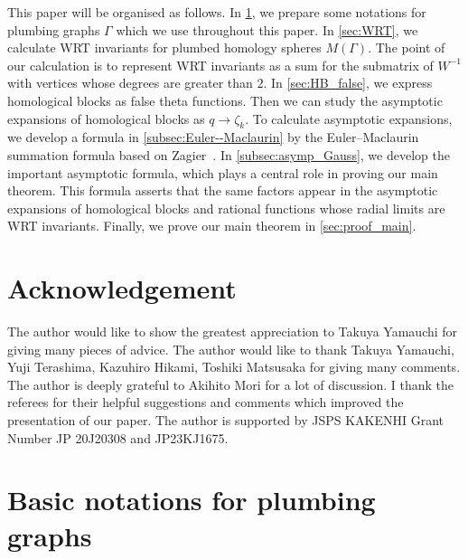 \documentclass[11pt,a4paper,lualatex]{amsart}
\numberwithin{equation}{section} %
\begin{document}
This paper will be organised as follows. 
In \cref{sec:fund_data}, we prepare some notations for plumbing graphs  $ \Gamma $ which we use throughout this paper.
In \cref{sec:WRT}, we calculate WRT invariants for plumbed homology spheres $ M(\Gamma) $.
The point of our calculation is to represent WRT invariants as a sum for the submatrix of $ W^{-1} $ with vertices whose degrees are greater than $ 2 $.
In \cref{sec:HB_false}, we express homological blocks as false theta functions.
Then we can study the asymptotic expansions of homological blocks as $ q \to \zeta_k $.
To calculate asymptotic expansions, we develop a formula in \cref{subsec:Euler--Maclaurin} by the Euler--Maclaurin summation formula based on Zagier~\cite[Equation (44)]{Zagier_asymptotic}.
In \cref{subsec:asymp_Gauss}, we develop the important asymptotic formula, which plays a central role in proving our main theorem.
This formula asserts that the same factors appear in the asymptotic expansions of homological blocks and rational functions whose radial limits are WRT invariants.
Finally, we prove our main theorem in \cref{sec:proof_main}.


\section*{Acknowledgement} \label{sec:acknowledgement}


The author would like to show the greatest appreciation to Takuya Yamauchi for giving many pieces of advice. 
The author would like to thank Takuya Yamauchi, Yuji Terashima, Kazuhiro Hikami, Toshiki Matsusaka for giving many comments. 
The author is deeply grateful to Akihito Mori for a lot of discussion. 
I thank the referees for their helpful suggestions and comments which improved the presentation of our paper.
The author is supported by JSPS KAKENHI Grant Number JP 20J20308 and JP23KJ1675.


\section{Basic notations for plumbing graphs} \label{sec:fund_data}
\end{document}
